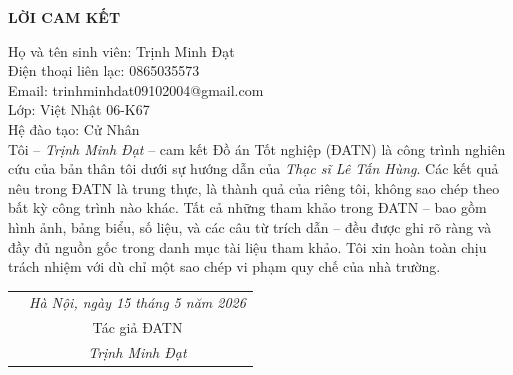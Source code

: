 \documentclass[../DoAn.tex]{subfiles}
\begin{document}
\hfill
\begin{center}
    \LARGE\textbf{LỜI CAM KẾT}\\
\end{center}
\vspace{1cm}
Họ và tên sinh viên: Trịnh Minh Đạt\dotfill\\
Điện thoại liên lạc: 0865035573 \dotfill\\ Email: trinhminhdat09102004@gmail.com \dotfill\\
Lớp: Việt Nhật 06-K67\dotfill\\
Hệ đào tạo: Cử Nhân \dotfill \\

\vspace{1cm}
Tôi – \emph{Trịnh Minh Đạt} – cam kết Đồ án Tốt nghiệp (ĐATN) là công trình nghiên cứu của bản thân tôi dưới sự hướng dẫn của \emph{Thạc sĩ Lê Tấn Hùng}. Các kết quả nêu trong ĐATN là trung thực, là thành quả của riêng tôi, không sao chép theo bất kỳ công trình nào khác. Tất cả những tham khảo trong ĐATN – bao gồm hình ảnh, bảng biểu, số liệu, và các câu từ trích dẫn – đều được ghi rõ ràng và đầy đủ nguồn gốc trong danh mục tài liệu tham khảo. Tôi xin hoàn toàn chịu trách nhiệm với dù chỉ một sao chép vi phạm quy chế của nhà trường.

\begin{table}[H]
\centering
\begin{tabular}{p{5cm} c}
\multicolumn{1}{c}{\textbf{}} &\emph{Hà Nội, ngày 15 tháng 5 năm 2026   }\vspace{0.4cm}\\
\textbf{}               & Tác giả ĐATN \vspace{3cm} \\

\textbf{}               & \emph{Trịnh Minh Đạt}
\end{tabular}
\end{table}
\end{document}
